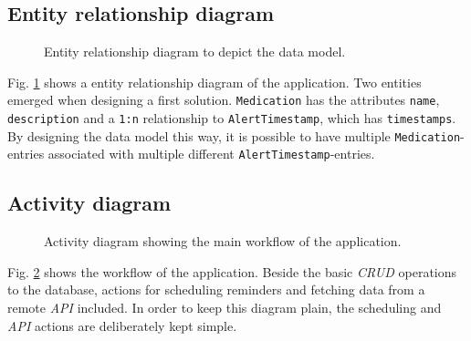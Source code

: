 \documentclass[conference]{IEEEtran}
\begin{document}
\subsection{Entity relationship diagram}
\begin{figure}[H]
	\centerline{}
	\caption{Entity relationship diagram to depict the data model.}
	\label{fig:entity_relationship_diagram}
\end{figure}

Fig. \ref{fig:entity_relationship_diagram} shows a entity relationship diagram of the application.
Two entities emerged when designing a first solution. \texttt{Medication} has the attributes \texttt{name},
\texttt{description} and a \texttt{1:n} relationship to \texttt{AlertTimestamp}, which has \texttt{timestamps}.
By designing the data model this way, it is possible to have multiple \texttt{Medication}-entries associated
with multiple different \texttt{AlertTimestamp}-entries.

\subsection{Activity diagram}
\begin{figure}[H]
	\centerline{}
	\caption{Activity diagram showing the main workflow of the application.}
	\label{fig:activity_diagram}
\end{figure}

Fig. \ref{fig:activity_diagram} shows the workflow of the application. Beside the basic \textit{CRUD} operations
to the database, actions for scheduling reminders and fetching data from a remote \textit{API} included. In order
to keep this diagram plain, the scheduling and \textit{API} actions are deliberately kept simple.
\end{document}
